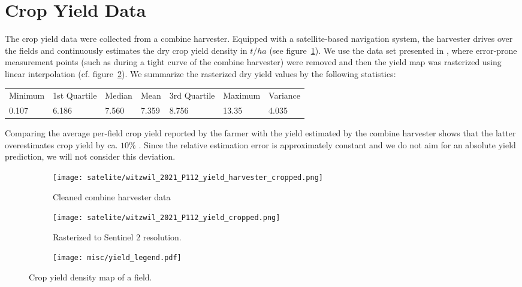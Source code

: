\section{Crop Yield Data}{
	\label{sec:yieldmapping_data}
	The crop yield data were collected from a combine harvester. Equipped with a satellite-based navigation system, the harvester drives over the fields and continuously estimates the dry crop yield density in $t/ha$ (see figure~\ref{fig:satelite/witzwil_2021_P112_yield_harvester_cropped}). 
	We use the data set presented in \cite{perichPixelbasedCropYield2022}, where error-prone measurement points (such as during a tight curve of the combine harvester) were removed and then the yield map was rasterized using linear interpolation (cf. figure~\ref{fig:satelite/witzwil_2021_P112_yield_cropped.png}). We summarize the rasterized dry yield values by the following statistics:

	\begin{tabular}{l l l l l l l} 
		Minimum & 1st Quartile & Median & Mean  & 3rd Quartile & Maximum & Variance \\
		0.107   & 6.186        & 7.560  & 7.359 & 8.756        & 13.35   & 4.035
	\end{tabular}    

	Comparing the average per-field crop yield reported by the farmer with the yield estimated by the combine harvester shows that the latter overestimates crop yield by ca. $10\%$ \citep{perichPixelbasedCropYield2022}. Since the relative estimation error is approximately constant and we do not aim for an absolute yield prediction, we will not consider this deviation. 



	\begin{figure}
		\centering
		\begin{subfigure}{.42\textwidth}
			\centering
			\texttt{[image: satelite/witzwil\_2021\_P112\_yield\_harvester\_cropped.png]}
			\caption{\small Cleaned combine harvester data}
			\label{fig:satelite/witzwil_2021_P112_yield_harvester_cropped}
		\end{subfigure}%
		\begin{subfigure}{.42\textwidth}
			\centering
			\texttt{[image: satelite/witzwil\_2021\_P112\_yield\_cropped.png]}
			\caption{\small Rasterized to Sentinel 2 resolution.}
			\label{fig:satelite/witzwil_2021_P112_yield_cropped.png}
		\end{subfigure}
		\begin{subfigure}{.14\textwidth}
			\centering
			\texttt{[image: misc/yield\_legend.pdf]}
			\vspace{0.5cm}
		\end{subfigure}
		\vspace{0.2cm}
		\caption[Crop yield density map of a field]{Crop yield density map of a field. }
		\label{fig:satelite_witzwil_yield}
	\end{figure}
}

